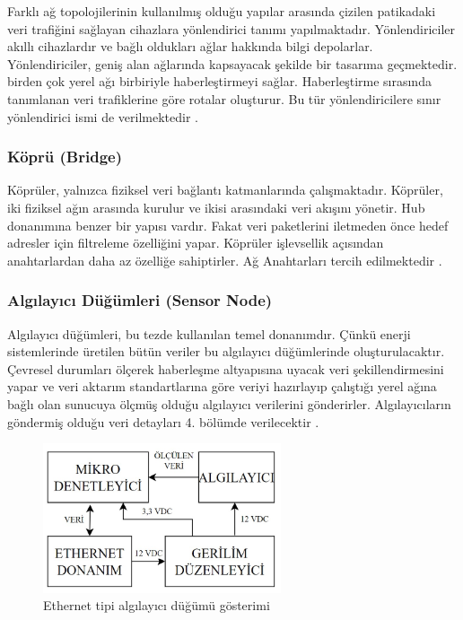 Farklı ağ topolojilerinin kullanılmış olduğu yapılar arasında çizilen patikadaki veri trafiğini sağlayan cihazlara yönlendirici tanımı yapılmaktadır. Yönlendiriciler akıllı cihazlardır ve bağlı oldukları ağlar hakkında bilgi depolarlar. Yönlendiriciler, geniş alan ağlarında kapsayacak şekilde bir tasarıma geçmektedir. birden çok yerel ağı birbiriyle haberleştirmeyi sağlar. Haberleştirme sırasında tanımlanan veri trafiklerine göre rotalar oluşturur. Bu tür yönlendiricilere sınır yönlendirici ismi de verilmektedir  \cite{parziale_2006}.

\subsubsection{Köprü (Bridge)}


Köprüler, yalnızca fiziksel veri bağlantı katmanlarında çalışmaktadır. Köprüler, iki fiziksel ağın arasında kurulur ve ikisi arasındaki veri akışını yönetir. Hub donanımına benzer bir yapısı vardır. Fakat veri paketlerini iletmeden önce hedef adresler için filtreleme özelliğini yapar. Köprüler işlevsellik açısından anahtarlardan daha az özelliğe sahiptirler. Ağ Anahtarları tercih edilmektedir \cite{parziale_2006}.


\subsubsection{Algılayıcı Düğümleri (Sensor Node)}\label{algilayicidugum}

Algılayıcı düğümleri, bu tezde kullanılan temel donanımdır. Çünkü enerji sistemlerinde üretilen bütün veriler bu algılayıcı düğümlerinde oluşturulacaktır. Çevresel durumları ölçerek haberleşme altyapısına uyacak veri şekillendirmesini yapar ve veri aktarım standartlarına göre veriyi hazırlayıp çalıştığı yerel ağına bağlı olan sunucuya ölçmüş olduğu algılayıcı verilerini gönderirler. Algılayıcıların göndermiş olduğu veri detayları 4. bölümde verilecektir \cite{parziale_2006}.

\begin{figure}[htbp]
\centerline{\includegraphics[width=7cm]{Resim/sekil3-3.jpg}}
\caption{Ethernet tipi algılayıcı düğümü gösterimi}
\label{fig:figure9}
\end{figure}

